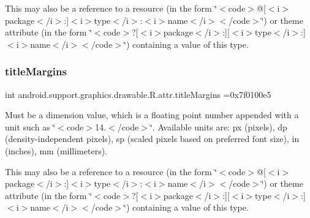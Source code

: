 This may also be a reference to a resource (in the form \char`\"{}$<$code$>$@\mbox{[}$<$i$>$package$<$/i$>$\+:\mbox{]}$<$i$>$type$<$/i$>$\+:$<$i$>$name$<$/i$>$$<$/code$>$\char`\"{}) or theme attribute (in the form \char`\"{}$<$code$>$?\mbox{[}$<$i$>$package$<$/i$>$\+:\mbox{]}\mbox{[}$<$i$>$type$<$/i$>$\+:\mbox{]}$<$i$>$name$<$/i$>$$<$/code$>$\char`\"{}) containing a value of this type. \mbox{\label{classandroid_1_1support_1_1graphics_1_1drawable_1_1R_1_1attr_a08363a287bec2676fd6e25b8374aa018}} 
\subsubsection{\texorpdfstring{title\+Margins}{titleMargins}}
{\footnotesize\ttfamily int android.\+support.\+graphics.\+drawable.\+R.\+attr.\+title\+Margins =0x7f0100e5\hspace{0.3cm}{\ttfamily [static]}}

Must be a dimension value, which is a floating point number appended with a unit such as \char`\"{}$<$code$>$14.\+5sp$<$/code$>$\char`\"{}. Available units are\+: px (pixels), dp (density-\/independent pixels), sp (scaled pixels based on preferred font size), in (inches), mm (millimeters). 

This may also be a reference to a resource (in the form \char`\"{}$<$code$>$@\mbox{[}$<$i$>$package$<$/i$>$\+:\mbox{]}$<$i$>$type$<$/i$>$\+:$<$i$>$name$<$/i$>$$<$/code$>$\char`\"{}) or theme attribute (in the form \char`\"{}$<$code$>$?\mbox{[}$<$i$>$package$<$/i$>$\+:\mbox{]}\mbox{[}$<$i$>$type$<$/i$>$\+:\mbox{]}$<$i$>$name$<$/i$>$$<$/code$>$\char`\"{}) containing a value of this type. \mbox{\label{classandroid_1_1support_1_1graphics_1_1drawable_1_1R_1_1attr_a4bf56ec7e4d57758aba4a7a548d3761c}} 
